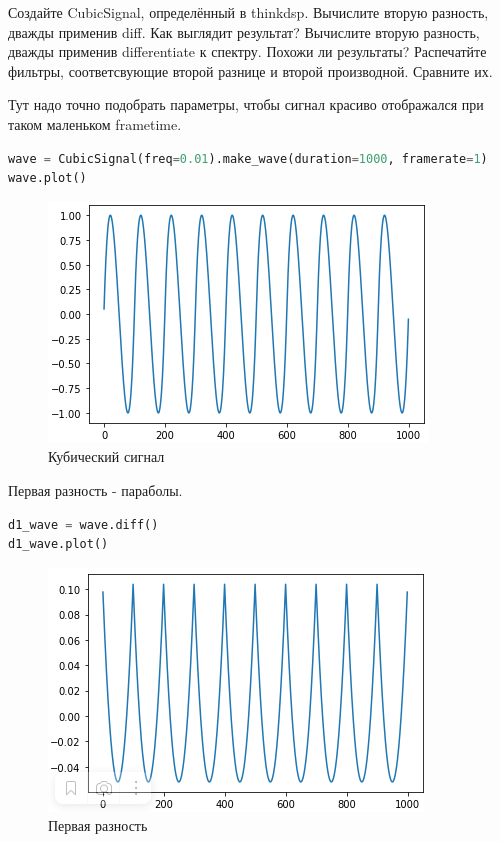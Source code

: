 Создайте CubicSignal, определённый в thinkdsp. Вычислите вторую разность, дважды применив diff. Как выглядит результат? Вычислите вторую разность, дважды применив differentiate к спектру. Похожи ли результаты? Распечатйте фильтры, соответсвующие второй разнице и второй производной. Сравните их.

Тут надо точно подобрать параметры, чтобы сигнал красиво отображался при таком маленьком frametime.

\begin{lstlisting}[language=Python]
wave = CubicSignal(freq=0.01).make_wave(duration=1000, framerate=1)
wave.plot()
\end{lstlisting}
\begin{figure}[H]
	\begin{center}
		\includegraphics[scale=1]{fig/lab09/lab9_12.png}
		\caption{Кубический сигнал}
	\end{center}
\end{figure}

Первая разность - параболы.

\begin{lstlisting}[language=Python]
d1_wave = wave.diff()
d1_wave.plot()
\end{lstlisting}
\begin{figure}[H]
	\begin{center}
		\includegraphics[scale=1]{fig/lab09/lab9_13.png}
		\caption{Первая разность}
	\end{center}
\end{figure}

